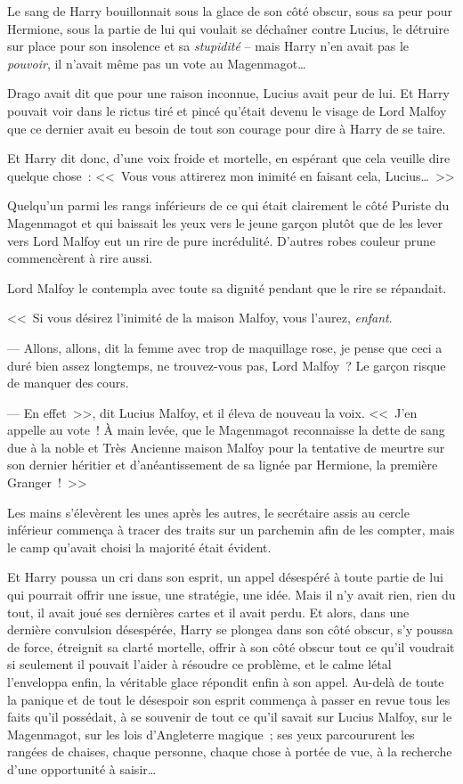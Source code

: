 \later

Le sang de Harry bouillonnait sous la glace de son côté obscur, sous sa peur pour Hermione, sous la partie de lui qui voulait se déchaîner contre Lucius, le détruire sur place pour son insolence et sa \emph{stupidité} -- mais Harry n'en avait pas le \emph{pouvoir}, il n'avait même pas un vote au Magenmagot…

Drago avait dit que pour une raison inconnue, Lucius avait peur de lui. Et Harry pouvait voir dans le rictus tiré et pincé qu'était devenu le visage de Lord Malfoy que ce dernier avait eu besoin de tout son courage pour dire à Harry de se taire.

Et Harry dit donc, d'une voix froide et mortelle, en espérant que cela veuille dire quelque chose~: <<~Vous vous attirerez mon inimité en faisant cela, Lucius…~>>

Quelqu'un parmi les rangs inférieurs de ce qui était clairement le côté Puriste du Magenmagot et qui baissait les yeux vers le jeune garçon plutôt que de les lever vers Lord Malfoy eut un rire de pure incrédulité. D'autres robes couleur prune commencèrent à rire aussi.

Lord Malfoy le contempla avec toute sa dignité pendant que le rire se répandait.

<<~Si vous désirez l'inimité de la maison Malfoy, vous l'aurez, \emph{enfant}.

--- Allons, allons, dit la femme avec trop de maquillage rose, je pense que ceci a duré bien assez longtemps, ne trouvez-vous pas, Lord Malfoy~? Le garçon risque de manquer des cours.

--- En effet~>>, dit Lucius Malfoy, et il éleva de nouveau la voix. <<~J'en appelle au vote~! À main levée, que le Magenmagot reconnaisse la dette de sang due à la noble et Très Ancienne maison Malfoy pour la tentative de meurtre sur son dernier héritier et d'anéantissement de sa lignée par Hermione, la première Granger~!~>>

Les mains s'élevèrent les unes après les autres, le secrétaire assis au cercle inférieur commença à tracer des traits sur un parchemin afin de les compter, mais le camp qu'avait choisi la majorité était évident.

Et Harry poussa un cri dans son esprit, un appel désespéré à toute partie de lui qui pourrait offrir une issue, une stratégie, une idée. Mais il n'y avait rien, rien du tout, il avait joué ses dernières cartes et il avait perdu. Et alors, dans une dernière convulsion désespérée, Harry se plongea dans son côté obscur, s'y poussa de force, étreignit sa clarté mortelle, offrir à son côté obscur tout ce qu'il voudrait si seulement il pouvait l'aider à résoudre ce problème, et le calme létal l'enveloppa enfin, la véritable glace répondit enfin à son appel. Au-delà de toute la panique et de tout le désespoir son esprit commença à passer en revue tous les faits qu'il possédait, à se souvenir de tout ce qu'il savait sur Lucius Malfoy, sur le Magenmagot, sur les lois d'Angleterre magique~; ses yeux parcoururent les rangées de chaises, chaque personne, chaque chose à portée de vue, à la recherche d'une opportunité à saisir… 

